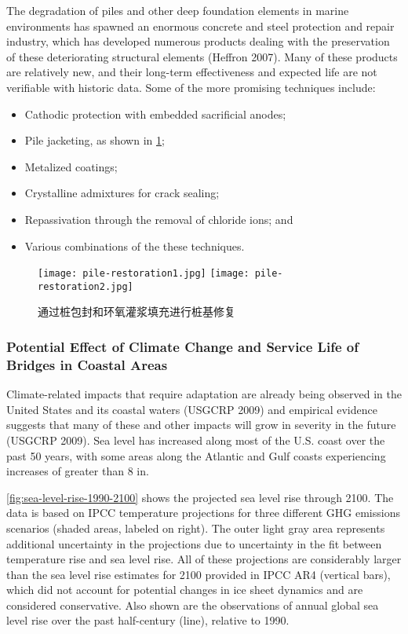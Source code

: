 The degradation of piles and other deep foundation elements in marine environments has spawned an enormous concrete and steel protection and repair industry, which has developed numerous products dealing with the preservation of these deteriorating structural elements (Heffron 2007). Many of these products are relatively new, and their long-term effectiveness and expected life are not verifiable with historic data. Some of the more promising techniques include:

\begin{itemize}
  \item Cathodic protection with embedded sacrificial anodes;
  \item Pile jacketing, as shown in \cref{fig:pile-restoration-pile-encapsulation};
  \item Metalized coatings;
  \item Crystalline admixtures for crack sealing;
  \item Repassivation through the removal of chloride ions; and
  \item Various combinations of the these techniques.
\end{itemize}

\begin{figure}
  \texttt{[image: pile-restoration1.jpg]}\hfill
  \texttt{[image: pile-restoration2.jpg]}
  \caption{通过桩包封和环氧灌浆填充进行桩基修复}
  \label{fig:pile-restoration-pile-encapsulation}
\end{figure}

\subsubsection{Potential Effect of Climate Change and Service Life of Bridges in Coastal Areas}

Climate-related impacts that require adaptation are already being observed in the United States and its coastal waters (USGCRP 2009) and empirical evidence suggests that many of these and other impacts will grow in severity in the future (USGCRP 2009). Sea level has increased along most of the U.S. coast over the past 50 years, with some areas along the Atlantic and Gulf coasts experiencing increases of greater than 8 in.

\cref{fig:sea-level-rise-1990-2100} shows the projected sea level rise through 2100. The data is based on IPCC temperature projections for three different GHG emissions scenarios (shaded areas, labeled on right). The outer light gray area represents additional uncertainty in the projections due to uncertainty in the fit between temperature rise and sea level rise. All of these projections are considerably larger than the sea level rise estimates for 2100 provided in IPCC AR4 (vertical bars), which did not account for potential changes in ice sheet dynamics and are considered conservative. Also shown are the observations of annual global sea level rise over the past half-century (line), relative to 1990.

